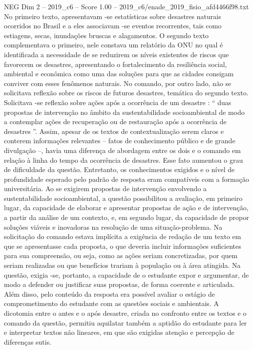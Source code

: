 \begin{textsample}{NEG Dim 2 – 2019\_c6 – Score 1.00 – 2019\_c6/enade\_2019\_fisio\_afd4466f98.txt}
No primeiro texto, apresentavam -se estatísticas sobre desastres naturais ocorridos no Brasil e a eles associavam -se eventos recorrentes, tais como estiagens, secas, inundações bruscas e alagamentos.
O segundo texto complementava o primeiro, nele constava um relatório da ONU no qual é identificada a necessidade de se reduzirem os níveis existentes de riscos que favorecem os desastres, apresentando o fortalecimento da resiliência social, ambiental e econômica como uma das soluções para que as cidades consigam conviver com esses fenômenos naturais.
No comando, por outro lado, não se solicitava reflexão sobre os riscos de futuros desastres, temática do segundo texto.
Solicitava -se reflexão sobre ações após a ocorrência de um desastre : “ duas propostas de intervenção no âmbito da sustentabilidade socioambiental de modo a contemplar ações de recuperação ou de restauração após a ocorrência de desastres ”.
Assim, apesar de os textos de contextualização serem claros e conterem informações relevantes – fatos de conhecimento público e de grande divulgação –, havia uma diferença de abordagem entre os dois e o comando em relação à linha do tempo da ocorrência de desastres.
Esse fato aumentou o grau de dificuldade da questão.
Entretanto, os conhecimentos exigidos e o nível de profundidade esperado pelo padrão de resposta eram compatíveis com a formação universitária.
Ao se exigirem propostas de intervenção envolvendo a sustentabilidade socioambiental, a questão possibilitou a avaliação, em primeiro lugar, da capacidade de elaborar e apresentar propostas de ação e de intervenção, a partir da análise de um contexto, e, em segundo lugar, da capacidade de propor soluções viáveis e inovadoras na resolução de uma situação-problema.
Na solicitação do comando estava implícita a exigência de redação de um texto em que se apresentasse cada proposta, o que deveria incluir informações suficientes para sua compreensão, ou seja, como as ações seriam concretizadas, por quem seriam realizadas ou que benefícios trariam à população ou à área atingida.
Na questão, exigia -se, portanto, a capacidade de o estudante expor e argumentar, de modo a defender ou justificar suas propostas, de forma coerente e articulada.
Além disso, pelo conteúdo da resposta era possível avaliar o estágio de comprometimento do estudante com as questões sociais e ambientais.
A dicotomia entre o antes e o após desastre, criada no confronto entre os textos e o comando da questão, permitiu aquilatar também a aptidão do estudante para ler e interpretar textos não lineares, em que são exigidas atenção e percepção de diferenças sutis.

\end{textsample}
